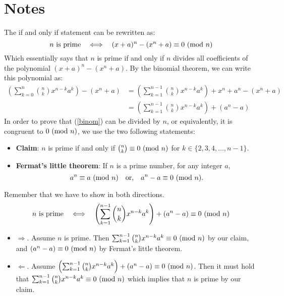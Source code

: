 \documentclass[../main.tex]{subfiles}
\begin{document}
\section{Notes}

The if and only if statement can be rewritten as:
\begin{equation*}
    \text{$n$ is prime}\quad\Longleftrightarrow\quad(x + a)^n - (x^n + a)\equiv 0 \ (\mathrm{mod}\ n)
\end{equation*}
Which essentially says that $n$ is prime if and only if $n$ divides all coefficients of the polynomial $(x+a)^n-(x^n+a)$. By the binomial theorem, we can write this polynomial as:
\begin{equation}
    \begin{split}    
        \left(\sum_{k=0}^{n} \binom{n}{k}x^{n-k}a^k\right)-\left(x^n+a \right)
        & =\left(\sum_{k=1}^{n-1} \binom{n}{k}x^{n-k}a^k\right)+ x^n +a^n-\left(x^n+a\right)
        \\ &= \left(\sum_{k=1}^{n-1} \binom{n}{k}x^{n-k}a^k\right) + \left(a^n-a\right)
    \end{split}
    \label{binom}
\end{equation}
In order to prove that (\ref{binom}) can be divided by $n$, or equivalently, it is congruent to $0 \ (\mathrm{mod}\ n)$, we use the two following statements:
\begin{itemize}
    \item \textbf{Claim}: $n$ is prime if and only if $\binom{n}{k}\equiv 0 \ (\mathrm{mod}\ n)$ for $k\in\{2,3,4,\dots,n-1\}$. 
    \item \textbf{Fermat's little theorem}: If $n$ is a prime number, for any integer $a$,
    \begin{equation*}
        a^n \equiv a \ (\mathrm{mod}\ n) \quad\text{or,}\quad a^n -a \equiv 0 \ (\mathrm{mod}\ n).
    \end{equation*}
\end{itemize}
Remember that we have to show in both directions.
\begin{equation*}
    \text{$n$ is prime}\quad\Longleftrightarrow\quad \left(\sum_{k=1}^{n-1} \binom{n}{k}x^{n-k}a^k\right) + (a^n-a)\equiv 0 \ (\mathrm{mod}\ n)
\end{equation*}

\begin{itemize}
    \item $\Longrightarrow$. Assume $n$ is prime. Then $\sum_{k=1}^{n-1} \binom{n}{k}x^{n-k}a^k\equiv0\ (\mathrm{mod}\ n)$ by our claim, and $(a^n-a)\equiv 0 \ (\mathrm{mod}\ n)$ by Fermat's little theorem. 
    \item $\Longleftarrow$. Assume $\left(\sum_{k=1}^{n-1} \binom{n}{k}x^{n-k}a^k\right) + (a^n-a)\equiv 0 \ (\mathrm{mod}\ n)$. Then it must hold that $\sum_{k=1}^{n-1} \binom{n}{k}x^{n-k}a^k\equiv 0 \ (\mathrm{mod}\ n)$ which implies that $n$ is prime by our claim.
\end{itemize}
\end{document}
